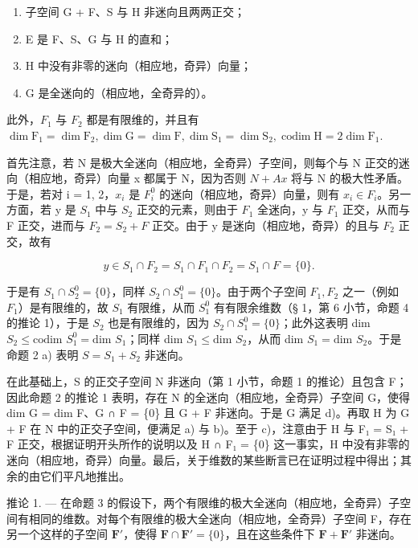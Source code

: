 \begin{enumerate}
\def\labelenumi{\alph{enumi})}
\item
  子空间 G + F、S 与 H 非迷向且两两正交；
\item
  E 是 F、S、G 与 H 的直和；
\item
  H 中没有非零的迷向（相应地，奇异）向量；
\item
  G 是全迷向的（相应地，全奇异的）。
\end{enumerate}

此外，\(F_{1}\) 与 \(F_{2}\) 都是有限维的，并且有 \(\dim \mathrm{F}_1 = \dim \mathrm{F}_2, \dim \mathrm{G} = \dim \mathrm{F}, \dim \mathrm{S}_1 = \dim \mathrm{S}_2, \operatorname{codim} \mathrm{H} = 2 \dim \mathrm{F}_1.\)

首先注意，若 N 是极大全迷向（相应地，全奇异）子空间，则每个与 N 正交的迷向（相应地，奇异）向量 x 都属于 N，因为否则 \(N + Ax\) 将与 N 的极大性矛盾。于是，若对 i = 1, 2，\(x_{i}\) 是 \(F_{i}^{0}\) 的迷向（相应地，奇异）向量，则有 \(x_{i} \in F_{i}\)。另一方面，若 y 是 \(S_{1}\) 中与 \(S_{2}\) 正交的元素，则由于 \(F_{1}\) 全迷向，y 与 \(F_{1}\) 正交，从而与 F 正交，进而与 \(F_{2} = S_{2} + F\) 正交。由于 y 是迷向（相应地，奇异）的且与 \(F_{2}\) 正交，故有

\[
y \in S _ {1} \cap F _ {2} = S _ {1} \cap F _ {1} \cap F _ {2} = S _ {1} \cap F = \{0 \}.
\]

于是有 \(S_1 \cap S_2^0 = \{0\}\)，同样 \(S_2 \cap S_1^0 = \{0\}\)。由于两个子空间 \(F_1, F_2\) 之一（例如 \(F_1\)）是有限维的，故 \(S_1\) 有限维，从而 \(S_1^0\) 有有限余维数（§ 1，第 6 小节，命题 4 的推论 1），于是 \(S_2\) 也是有限维的，因为 \(S_2 \cap S_1^0 = \{0\}\)；此外这表明 dim \(S_2 \leqslant \text{codim } S_1^0 = \text{dim } S_1\)；同样 dim \(S_1 \leqslant \text{dim } S_2\)，从而 dim \(S_1 = \text{dim } S_2\)。于是命题 2 a) 表明 \(S = S_1 + S_2\) 非迷向。

在此基础上，S 的正交子空间 N 非迷向（第 1 小节，命题 1 的推论）且包含 F；因此命题 2 的推论 1 表明，存在 N 的全迷向（相应地，全奇异）子空间 G，使得 dim G = dim F、G ∩ F = \{0\} 且 G + F 非迷向。于是 G 满足 d)。再取 H 为 G + F 在 N 中的正交子空间，便满足 a) 与 b)。至于 c)，注意由于 H 与 F₁ = S₁ + F 正交，根据证明开头所作的说明以及 H ∩ F₁ = \{0\} 这一事实，H 中没有非零的迷向（相应地，奇异）向量。最后，关于维数的某些断言已在证明过程中得出；其余的由它们平凡地推出。

推论 1. --- 在命题 3 的假设下，两个有限维的极大全迷向（相应地，全奇异）子空间有相同的维数。对每个有限维的极大全迷向（相应地，全奇异）子空间 F，存在另一个这样的子空间 \(\mathbf{F}'\)，使得 \(\mathbf{F} \cap \mathbf{F}' = \{0\}\)，且在这些条件下 \(\mathbf{F} + \mathbf{F}'\) 非迷向。

